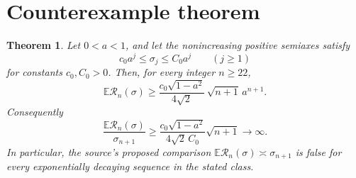 \documentclass[11pt]{article}
\newtheorem{theorem}{Theorem}
\newcommand{\E}{\mathbb E}
\newcommand{\cR}{\mathcal R}
\begin{document}
\section{Counterexample theorem}

\begin{theorem}\label{thm:main}
Let $0<a<1$, and let the nonincreasing positive semiaxes satisfy
\[
              c_0a^j\le \sigma_j\le C_0a^j\qquad(j\ge1)
\]
for constants $c_0,C_0>0$.  Then, for every integer $n\ge22$,
\begin{equation}\label{eq:explicit}
 \E\cR_n(\sigma)
 \ge \frac{c_0\sqrt{1-a^2}}{4\sqrt2}\,
        \sqrt{n+1}\,a^{n+1}.
\end{equation}
Consequently
\[
 \frac{\E\cR_n(\sigma)}{\sigma_{n+1}}
 \ge \frac{c_0\sqrt{1-a^2}}{4\sqrt2\,C_0}\sqrt{n+1}
 \longrightarrow\infty.
\]
In particular, the source's proposed comparison
$\E\cR_n(\sigma)\asymp\sigma_{n+1}$ is false for every exponentially
decaying sequence in the stated class.
\end{theorem}
\end{document}
